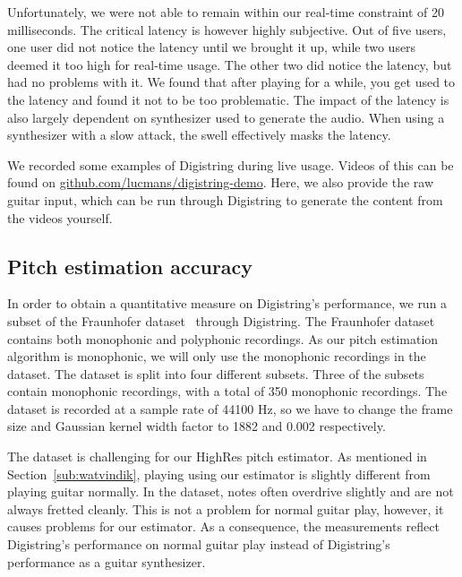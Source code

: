 \documentclass[a4paper,10pt,twocolumn]{article}
\begin{document}
Unfortunately, we were not able to remain within our real-time constraint of 20 milliseconds. The critical latency is however highly subjective. Out of five users, one user did not notice the latency until we brought it up, while two users deemed it too high for real-time usage. The other two did notice the latency, but had no problems with it. We found that after playing for a while, you get used to the latency and found it not to be too problematic. The impact of the latency is also largely dependent on synthesizer used to generate the audio. When using a synthesizer with a slow attack, the swell effectively masks the latency.

We recorded some examples of Digistring during live usage. Videos of this can be found on \url{github.com/lucmans/digistring-demo}. Here, we also provide the raw guitar input, which can be run through Digistring to generate the content from the videos yourself.


\subsection{Pitch estimation accuracy}
In order to obtain a quantitative measure on Digistring's performance, we run a subset of the Fraunhofer dataset~\cite{dataset} through Digistring. The Fraunhofer dataset contains both monophonic and polyphonic recordings. As our pitch estimation algorithm is monophonic, we will only use the monophonic recordings in the dataset. The dataset is split into four different subsets. Three of the subsets contain monophonic recordings, with a total of 350 monophonic recordings. The dataset is recorded at a sample rate of 44100 Hz, so we have to change the frame size and Gaussian kernel width factor to 1882 and 0.002 respectively.

The dataset is challenging for our HighRes pitch estimator. As mentioned in Section~\ref{sub:watvindik}, playing using our estimator is slightly different from playing guitar normally. In the dataset, notes often overdrive slightly and are not always fretted cleanly. This is not a problem for normal guitar play, however, it causes problems for our estimator. As a consequence, the measurements reflect Digistring's performance on normal guitar play instead of Digistring's performance as a guitar synthesizer.
\end{document}
